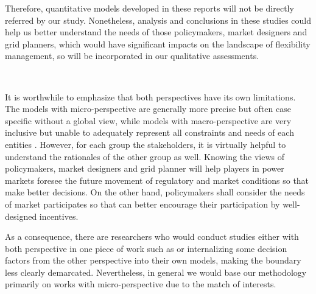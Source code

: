 Therefore, quantitative models developed in these reports will not be directly referred by our study. Nonetheless, analysis and conclusions in these studies could help us better understand the needs of those policymakers, market designers and grid planners, which would have significant impacts on the landscape of flexibility management, so will be incorporated in our qualitative assessments. 

~\newline

It is worthwhile to emphasize that both perspectives have its own limitations. The models with micro-perspective are generally more precise but often case specific without a global view, while models with macro-perspective are very inclusive but unable to adequately represent all constraints and needs of each entities \cite{Zucker2013}. However, for each group the stakeholders, it is virtually helpful to understand the rationales of the other group as well. Knowing the views of policymakers, market designers and grid planner will help players in power markets foresee the future movement of regulatory and market conditions so that make better decisions. On the other hand, policymakers shall consider the needs of market participates so that can better encourage their participation by well-designed incentives.

As a consequence, there are researchers who would conduct studies either with both perspective in one piece of work such as \cite{Sioshansi2009,Denholm2009} or internalizing some decision factors from the other perspective into their own models, making the boundary less clearly demarcated. Nevertheless, in general we would base our methodology primarily on works with micro-perspective due to the match of interests.







